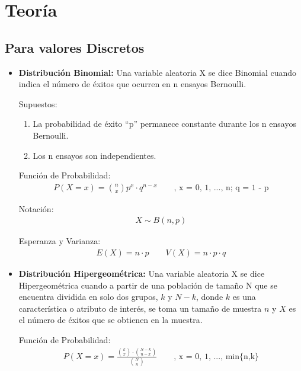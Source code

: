 \documentclass{templateNote}
\begin{document}
\portada
\margenes %

\section{Teoría}
\subsection*{Para valores Discretos}
\begin{itemize}
  \item \textbf{Distribución Binomial:} Una variable aleatoria X se dice Binomial cuando indica el número de éxitos que
  ocurren en n ensayos Bernoulli.

  Supuestos:
  \begin{enumerate}
    \item La probabilidad de éxito “p” permanece constante durante los n ensayos Bernoulli.
    \item Los n ensayos son independientes.
  \end{enumerate}

  Función de Probabilidad:
  \begin{align*}
    P(X=x) = \binom{n}{x} p^x \cdot q^{n-x} \qquad \text{, x = 0, 1, ..., n; q = 1 - p}
  \end{align*}

  Notación:
  \begin{align*}
    X \sim B(n, p)
  \end{align*}

  Esperanza y Varianza:
  \begin{align*}
    E(X) = n \cdot p \qquad V(X) = n \cdot p \cdot q
  \end{align*}

  \item \textbf{Distribución Hipergeométrica:} Una variable aleatoria X se dice Hipergeométrica cuando a partir de una población
  de tamaño N que se encuentra dividida en solo dos grupos, $k$ y $N - k$, donde $k$ es una
  característica o atributo de interés, se toma un tamaño de muestra $n$ y $X$ es el número de éxitos
  que se obtienen en la muestra.

  Función de Probabilidad:
  \begin{align*}
    P(X=x) = \frac{\displaystyle \binom{k}{x} \cdot \binom{N-k}{n-x}}{\displaystyle \binom{N}{n}} \qquad \text{, x = 0, 1, ..., min\{n,k\}}
  \end{align*}


\end{itemize}
\end{document}
